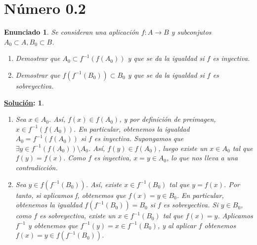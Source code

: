 \documentclass[10pt,a4paper,openright]{book}
\theoremstyle{break}
\newtheorem*{enun}{Enunciado}
\newtheorem*{ej}{\underline{Solución}:}
\begin{document}
\section{Número 0.2}
\begin{enun}
Se consideran una aplicación $f: A \rightarrow B$ y subconjutos $A_0 \subset A, B_0 \subset B$.
\begin{enumerate}[label={(\arabic*)}]
 \item Demostrar que $A_0 \subset f^{-1}(f(A_0))$ y que se da la igualdad si $f$  es inyectiva.
 \item Demostrar que $f(f^{-1}(B_0)) \subset B_0$ y que se da la igualdad si $f$ es sobreyectiva.
\end{enumerate}
\end{enun}
\begin{ej}
\begin{enumerate}[label={(\arabic*)}]
 \item Sea $x \in A_0$. Así, $f(x) \in f(A_0)$, y por definición de preimagen, $x \in f^{-1}(f(A_0))$. En particular, obtenemos la igualdad $A_0 
 = f^{-1}(f(A_0))$ si $f$ es inyectiva. Supongamos que $\exists y \in f^{-1}(f(A_0)) \setminus A_0$. Así, $f(y) \in f(A_0)$, luego existe un $x \in A_0$ tal que $f(y) = f(x)$. Como $f$ es inyectiva, $x = y \in A_0$, lo que nos lleva a una contradicción. 
 \item Sea $y \in f(f^{-1}(B_0))$. Así, existe $x \in f^{-1}(B_0)$ tal que $y = f(x)$. Por tanto, si aplicamos f, obtenemos que $f(x) = y \in B_0$. En particular, obtenemos la igualdad $f(f^{-1}(B_0)) = B_0$ si $f$ es sobreyectiva. Si $y \in B_0$, como $f$ es sobreyectiva, existe un $x \in f^{-1} (B_0)$ tal que $f(x) = y$. Aplicamos $f^{-1}$ y obtenemos que $f^{-1}(y) = x \in f^{-1}(B_0)$, y al aplicar $f$ obtenemos $f(x) = y \in f(f^{-1}(B_0))$.
\end{enumerate}
\end{ej}
\end{document}
